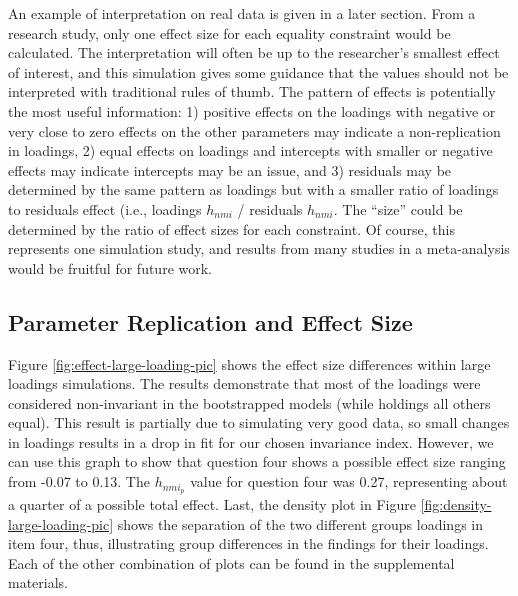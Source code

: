 \documentclass[
  man]{apa7}
\begin{document}
An example of interpretation on real data is given in a later section. From a research study, only one effect size for each equality constraint would be calculated. The interpretation will often be up to the researcher's smallest effect of interest, and this simulation gives some guidance that the values should not be interpreted with traditional rules of thumb. The pattern of effects is potentially the most useful information: 1) positive effects on the loadings with negative or very close to zero effects on the other parameters may indicate a non-replication in loadings, 2) equal effects on loadings and intercepts with smaller or negative effects may indicate intercepts may be an issue, and 3) residuals may be determined by the same pattern as loadings but with a smaller ratio of loadings to residuals effect (i.e., loadings \(h_{nmi}\) / residuals \(h_{nmi}\). The ``size'' could be determined by the ratio of effect sizes for each constraint. Of course, this represents one simulation study, and results from many studies in a meta-analysis would be fruitful for future work.

\subsection{Parameter Replication and Effect Size}\label{parameter-replication-and-effect-size}

Figure \ref{fig:effect-large-loading-pic} shows the effect size differences within large loadings simulations. The results demonstrate that most of the loadings were considered non-invariant in the bootstrapped models (while holdings all others equal). This result is partially due to simulating very good data, so small changes in loadings results in a drop in fit for our chosen invariance index. However, we can use this graph to show that question four shows a possible effect size ranging from -0.07 to 0.13. The \(h_{nmi_p}\) value for question four was 0.27, representing about a quarter of a possible total effect. Last, the density plot in Figure \ref{fig:density-large-loading-pic} shows the separation of the two different groups loadings in item four, thus, illustrating group differences in the findings for their loadings. Each of the other combination of plots can be found in the supplemental materials.
\end{document}
